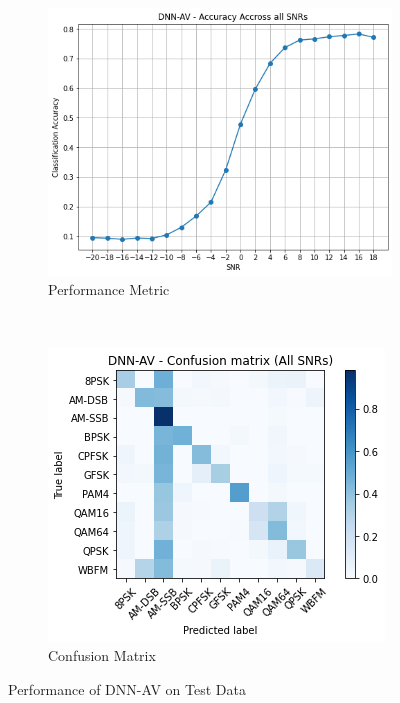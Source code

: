 \documentclass[journal,onecolumn]{IEEEtran}
\begin{document}
\begin{figure}[h]
    \centering
    \begin{subfigure}[b]{0.5\textwidth}
        \centering
        \includegraphics[scale=0.5]{dnnACCSNR}
        \caption{Performance Metric}
        \label{dnnACCSNR}
    \end{subfigure}%
    ~ 
    \begin{subfigure}[b]{0.5\textwidth}
        \centering
        \includegraphics[scale=0.7]{dnnoverallConfMat}
        \caption{Confusion Matrix}
        \label{dnnConfMat}
    \end{subfigure}
    \caption{Performance of DNN-AV on Test Data}
\end{figure}
\end{document}
